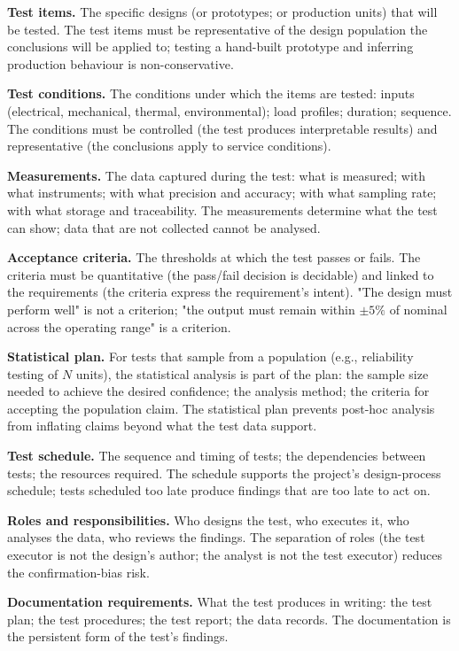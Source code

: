\textbf{Test items.} The specific designs (or prototypes; or production units) that will be tested. The test items must be representative of the design population the conclusions will be applied to; testing a hand-built prototype and inferring production behaviour is non-conservative.

\textbf{Test conditions.} The conditions under which the items are tested: inputs (electrical, mechanical, thermal, environmental); load profiles; duration; sequence. The conditions must be controlled (the test produces interpretable results) and representative (the conclusions apply to service conditions).

\textbf{Measurements.} The data captured during the test: what is measured; with what instruments; with what precision and accuracy; with what sampling rate; with what storage and traceability. The measurements determine what the test can show; data that are not collected cannot be analysed.

\textbf{Acceptance criteria.} The thresholds at which the test passes or fails. The criteria must be quantitative (the pass/fail decision is decidable) and linked to the requirements (the criteria express the requirement's intent). "The design must perform well" is not a criterion; "the output must remain within $\pm 5\%$ of nominal across the operating range" is a criterion.

\textbf{Statistical plan.} For tests that sample from a population (e.g., reliability testing of $N$ units), the statistical analysis is part of the plan: the sample size needed to achieve the desired confidence; the analysis method; the criteria for accepting the population claim. The statistical plan prevents post-hoc analysis from inflating claims beyond what the test data support.

\textbf{Test schedule.} The sequence and timing of tests; the dependencies between tests; the resources required. The schedule supports the project's design-process schedule; tests scheduled too late produce findings that are too late to act on.

\textbf{Roles and responsibilities.} Who designs the test, who executes it, who analyses the data, who reviews the findings. The separation of roles (the test executor is not the design's author; the analyst is not the test executor) reduces the confirmation-bias risk.

\textbf{Documentation requirements.} What the test produces in writing: the test plan; the test procedures; the test report; the data records. The documentation is the persistent form of the test's findings.

